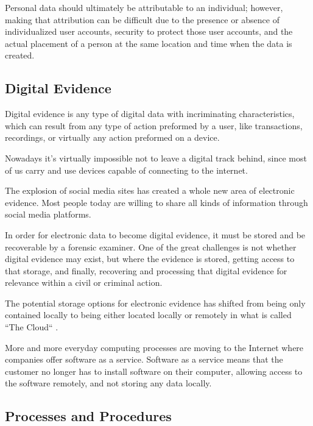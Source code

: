 Personal data should ultimately be attributable to an individual; however, making
that attribution can be difficult due to the presence or absence of individualized
user accounts, security to protect those user accounts, and the actual placement of a
person at the same location and time when the data is created.

\subsection{Digital Evidence}

Digital evidence is any type of digital data with incriminating characteristics,
which can result from any type of action preformed by a user, like transactions,
recordings, or virtually any action preformed on a device.

Nowadays it's virtually impossible not to leave a digital track behind, since most
of us carry and use devices capable of connecting to the internet.

The explosion of social media sites has created a whole new area of electronic
evidence. Most people today are willing to share all kinds of information through
social media platforms.

In order for electronic data to become digital evidence, it must be stored and be recoverable
by a forensic examiner. One of the great challenges is not whether digital
evidence may exist, but where the evidence is stored, getting access to that storage,
and finally, recovering and processing that digital evidence for relevance within
a civil or criminal action.

The potential storage options for electronic evidence has shifted from being only contained locally
to being either located locally or remotely in what is called ``The Cloud`` \cite{cloud}. 

More and more everyday computing processes are moving to the Internet
where companies offer software as a service. Software as a service means that
the customer no longer has to install software on their computer, allowing access to the software remotely,
and not storing any data locally.


\subsection{Processes and Procedures}

